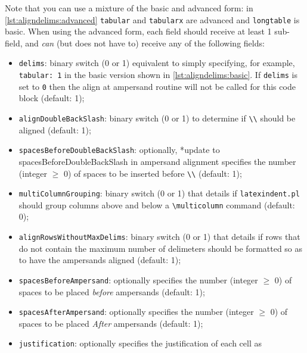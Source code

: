 	Note that you can use a mixture of the basic and advanced form: in
	\cref{lst:aligndelims:advanced} \texttt{tabular} and \texttt{tabularx} are advanced and
	\texttt{longtable} is basic. When using the advanced form, each field should receive at
	least 1 sub-field, and \emph{can} (but does not have to) receive any of the following
	fields:
	\begin{itemize}
		\item \texttt{delims}: binary switch (0 or 1) equivalent to simply specifying, for
		      example, \texttt{tabular: 1} in the basic version shown in \cref{lst:aligndelims:basic}.
		      If \texttt{delims} is set to \texttt{0} then the align at ampersand routine will not be
		      called for this code block (default: 1);
		\item \texttt{alignDoubleBackSlash}: binary switch (0 or 1) to determine if
		      \lstinline!\\!
		      should be aligned (default: 1);
		\item \texttt{spacesBeforeDoubleBackSlash}: optionally,%
		      *{update to spacesBeforeDoubleBackSlash in ampersand alignment}
		      specifies the number (integer $\geq$ 0) of spaces to be inserted before
		      \lstinline!\\! (default: 1); %
		\item {} \texttt{multiColumnGrouping}: binary switch (0
		      or 1) that details if \texttt{latexindent.pl} should group columns above and below a
		      \lstinline!\multicolumn! command (default: 0);
		\item {} \texttt{alignRowsWithoutMaxDelims}:
		      binary switch (0 or 1) that details if rows that do not contain the maximum number of
		      delimeters should be formatted so as to have the ampersands aligned (default: 1);
		\item {}\texttt{spacesBeforeAmpersand}: optionally specifies the number (integer $\geq$
		      0) of spaces to be placed \emph{before} ampersands (default: 1);
		\item {}\texttt{spacesAfterAmpersand}: optionally specifies the number (integer $\geq$
		      0) of spaces to be placed \emph{After} ampersands (default: 1);
		\item {}\texttt{justification}: optionally specifies the justification of each cell as

\end{itemize}
